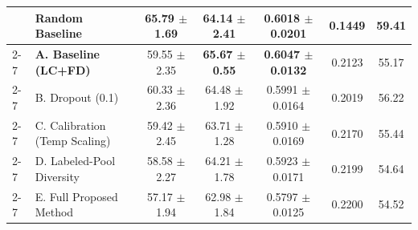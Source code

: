 \documentclass[conference,letterpaper]{IEEEtran}
\begin{document}
\begin{table}[!t]
{\begin{tabular}{|l|l|c|c|c|c|c|}
& \textbf{Random Baseline} & \textbf{65.79 $\pm$ 1.69} & 64.14 $\pm$ 2.41 & 0.6018 $\pm$ 0.0201 & \textbf{0.1449} & \textbf{59.41} \\
\cline{2-7}
& \textbf{A. Baseline (LC+FD)} & 59.55 $\pm$ 2.35 & \textbf{65.67 $\pm$ 0.55} & \textbf{0.6047 $\pm$ 0.0132} & 0.2123 & 55.17 \\
\cline{2-7}
& B. Dropout (0.1) & 60.33 $\pm$ 2.36 & 64.48 $\pm$ 1.92 & 0.5991 $\pm$ 0.0164 & 0.2019 & 56.22 \\
\cline{2-7}
& C. Calibration (Temp Scaling) & 59.42 $\pm$ 2.45 & 63.71 $\pm$ 1.28 & 0.5910 $\pm$ 0.0169 & 0.2170 & 55.44 \\
\cline{2-7}
& D. Labeled-Pool Diversity & 58.58 $\pm$ 2.27 & 64.21 $\pm$ 1.78 & 0.5923 $\pm$ 0.0171 & 0.2199 & 54.64 \\
\cline{2-7}
& E. Full Proposed Method & 57.17 $\pm$ 1.94 & 62.98 $\pm$ 1.84 & 0.5797 $\pm$ 0.0125 & 0.2200 & 54.52 \\
\hline
\end{tabular}%
}
\end{table}

\begin{table}[!t]
\centering
\caption{Paired Statistical Significance Tests (Full Stacked Method vs. Baselines)}
\label{tab:statistical_tests}
\end{table}
\end{document}
